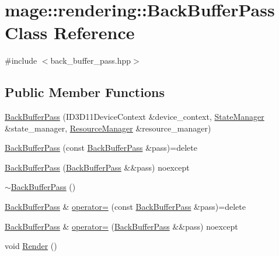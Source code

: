 \hypertarget{classmage_1_1rendering_1_1_back_buffer_pass}{}\section{mage\+:\+:rendering\+:\+:Back\+Buffer\+Pass Class Reference}
\label{classmage_1_1rendering_1_1_back_buffer_pass}


{\ttfamily \#include $<$back\+\_\+buffer\+\_\+pass.\+hpp$>$}

\subsection*{Public Member Functions}
\begin{DoxyCompactItemize}
\item 
\mbox{\hyperlink{classmage_1_1rendering_1_1_back_buffer_pass_a054aad27e4b3d05baf235ae256934ef2}{Back\+Buffer\+Pass}} (I\+D3\+D11\+Device\+Context \&device\+\_\+context, \mbox{\hyperlink{classmage_1_1rendering_1_1_state_manager}{State\+Manager}} \&state\+\_\+manager, \mbox{\hyperlink{classmage_1_1rendering_1_1_resource_manager}{Resource\+Manager}} \&resource\+\_\+manager)
\item 
\mbox{\hyperlink{classmage_1_1rendering_1_1_back_buffer_pass_aa8042001dccc96e61b01a5775421a41d}{Back\+Buffer\+Pass}} (const \mbox{\hyperlink{classmage_1_1rendering_1_1_back_buffer_pass}{Back\+Buffer\+Pass}} \&pass)=delete
\item 
\mbox{\hyperlink{classmage_1_1rendering_1_1_back_buffer_pass_ac8dfbaabb766f4bfd61cfea8d01dd7dc}{Back\+Buffer\+Pass}} (\mbox{\hyperlink{classmage_1_1rendering_1_1_back_buffer_pass}{Back\+Buffer\+Pass}} \&\&pass) noexcept
\item 
\mbox{\hyperlink{classmage_1_1rendering_1_1_back_buffer_pass_a697a5e094cdcdf9f42dd2efdda957b57}{$\sim$\+Back\+Buffer\+Pass}} ()
\item 
\mbox{\hyperlink{classmage_1_1rendering_1_1_back_buffer_pass}{Back\+Buffer\+Pass}} \& \mbox{\hyperlink{classmage_1_1rendering_1_1_back_buffer_pass_acad71e5633ba37b1069c5a2ef9e6f704}{operator=}} (const \mbox{\hyperlink{classmage_1_1rendering_1_1_back_buffer_pass}{Back\+Buffer\+Pass}} \&pass)=delete
\item 
\mbox{\hyperlink{classmage_1_1rendering_1_1_back_buffer_pass}{Back\+Buffer\+Pass}} \& \mbox{\hyperlink{classmage_1_1rendering_1_1_back_buffer_pass_a79649b9316cb114bae032027406b4fe4}{operator=}} (\mbox{\hyperlink{classmage_1_1rendering_1_1_back_buffer_pass}{Back\+Buffer\+Pass}} \&\&pass) noexcept
\item 
void \mbox{\hyperlink{classmage_1_1rendering_1_1_back_buffer_pass_af0e8bab1a86d7f37934e9d76aa253b29}{Render}} ()
\end{DoxyCompactItemize}
